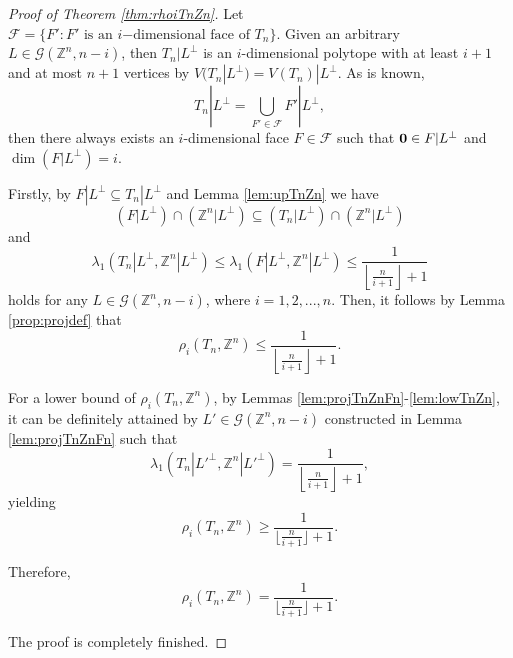 \documentclass{amsart}
\theoremstyle{definition}
\theoremstyle{remark}
\numberwithin{equation}{section}
\begin{document}
\begin{proof}[{\it Proof of Theorem \ref{thm:rhoiTnZn}}]
Let $\mathcal{F}=\{F':F'\text{ is an }i\mathrm{-}\text{dimensional face of }T_n\}$. Given an arbitrary $L\in\mathcal{G}(\mathbb{Z}^n,n-i)$, then $T_n|L^\perp$ is an $i$-dimensional polytope with at least $i+1$ and at most $n+1$ vertices by $V(T_n|L^\perp)=V(T_n)|L^\perp$. As is known,
$$T_n|L^\perp=\underset{F'\in\mathcal{F}}{\bigcup}F'|L^\perp,$$
then there always exists an $i$-dimensional face $F\in\mathcal{F}$ such that ${\bf 0}\in F|L^\perp$ and $\dim(F|L^\perp)=i$.

Firstly, by $F|L^\perp\subseteq T_n|L^\perp$ and Lemma \ref{lem:upTnZn} we have
$$(F|L^\perp)\cap(\mathbb{Z}^n|L^\perp)\subseteq(T_n|L^\perp)\cap(\mathbb{Z}^n|L^\perp)$$
and
$$\lambda_1(T_n|L^\perp,\mathbb{Z}^n|L^\perp)\le\lambda_1(F|L^\perp,\mathbb{Z}^n|L^\perp)\le\frac{1}{\left\lfloor\frac{n}{i+1}\right\rfloor+1}$$ holds for any $L\in\mathcal{G}(\mathbb{Z}^n,n-i)$, where $i=1,2,...,n$. 
Then, it follows by Lemma \ref{prop:projdef} that
$$\rho_i(T_n,\mathbb{Z}^n)\le\frac{1}{\left\lfloor\frac{n}{i+1}\right\rfloor+1}.$$ 

For a lower bound of $\rho_i(T_n,\mathbb{Z}^n)$, by Lemmas \ref{lem:projTnZnFn}-\ref{lem:lowTnZn}, it can be definitely attained by $L'\in\mathcal{G}(\mathbb{Z}^n,n-i)$ constructed in Lemma \ref{lem:projTnZnFn} such that 
$$\lambda_1(T_n|L'^\perp,\mathbb{Z}^n|L'^\perp)=\frac{1}{\left\lfloor\frac{n}{i+1}\right\rfloor+1},$$
yielding
$$\rho_i(T_n,\mathbb{Z}^n)\ge\frac1{\lfloor\frac{n}{i+1}\rfloor+1}.$$




Therefore,
$$\rho_i(T_n,\mathbb{Z}^n)=\frac1{\lfloor\frac{n}{i+1}\rfloor+1}.$$

The proof is completely finished. 
\end{proof}















\end{document}
